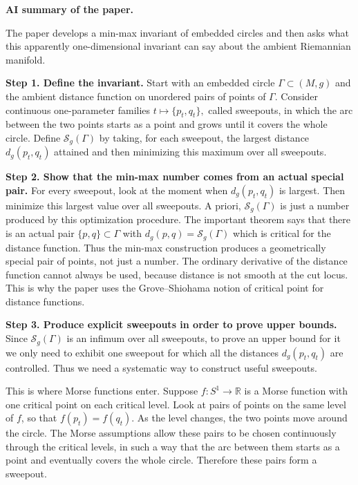 \medskip\noindent
{\bf AI summary of the paper.}


The paper develops a min-max invariant of
embedded circles and then asks what this
apparently one-dimensional invariant can say
about the ambient Riemannian manifold.

\medskip\noindent
{\bf Step 1. Define the invariant.}
Start with an embedded circle
$\Gamma\subset(M,g)$ and the ambient
distance function on unordered pairs of
points of $\Gamma$. Consider continuous
one-parameter families
$
t\longmapsto\{p_t,q_t\},
$
called sweepouts, in which the arc between
the two points starts as a point and grows
until it covers the whole circle. Define
$\mathcal{S}_g(\Gamma)$ by taking, for each
sweepout, the largest distance
$d_g(p_t,q_t)$ attained and then minimizing
this maximum over all sweepouts.

\medskip\noindent
{\bf Step 2. Show that the min-max number
comes from an actual special pair.}
For every sweepout, look at the moment when
$d_g(p_t,q_t)$ is largest. Then minimize this
largest value over all sweepouts. A priori,
$\mathcal{S}_g(\Gamma)$ is just a number
produced by this optimization procedure.
The important theorem says that there is an
actual pair $\{p,q\}\subset\Gamma$ with
$
d_g(p,q)=\mathcal{S}_g(\Gamma)
$
which is critical for the distance function.
Thus the min-max construction produces a
geometrically special pair of points, not
just a number. The ordinary derivative of
the distance function cannot always be used,
because distance is not smooth at the cut
locus. This is why the paper uses the
Grove--Shiohama notion of critical point for
distance functions.

\medskip\noindent
{\bf Step 3. Produce explicit sweepouts in
order to prove upper bounds.}
Since $\mathcal{S}_g(\Gamma)$ is an infimum
over all sweepouts, to prove an upper bound
for it we only need to exhibit one sweepout
for which all the distances
$d_g(p_t,q_t)$ are controlled. Thus we need
a systematic way to construct useful
sweepouts.

This is where Morse functions enter. Suppose
$
f:S^1\longrightarrow\mathbb{R}
$
is a Morse function with one critical point
on each critical level. Look at pairs of
points on the same level of $f$, so that
$
f(p_t)=f(q_t).
$
As the level changes, the two points move
around the circle. The Morse assumptions
allow these pairs to be chosen continuously
through the critical levels, in such a way
that the arc between them starts as a point
and eventually covers the whole circle.
Therefore these pairs form a sweepout.

